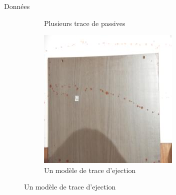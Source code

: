 \documentclass[11pt]{beamer}
\begin{document}
\begin{frame}{Données}
\begin{figure}[ht]
\begin{subfigure}{0.32\textwidth}
            \caption{Plusieurs trace de passives}
        \end{subfigure}
        \begin{subfigure}{0.32\textwidth}
            \centering
            \includegraphics[width=\linewidth]{../asset/1275.jpg}
            \caption{Un modèle de trace d'ejection}
        \end{subfigure}
    \end{figure}
\end{frame}
\end{document}
